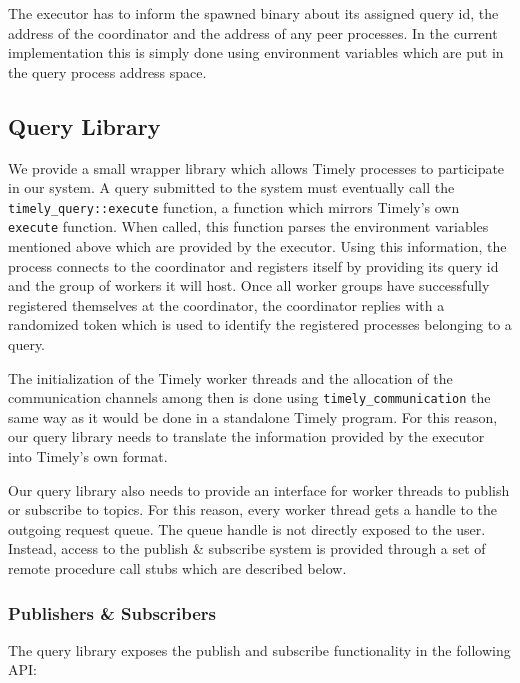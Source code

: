 The executor has to inform the spawned binary about its assigned query id,
the address of the coordinator and the address of any peer processes. In the
current implementation this is simply done using environment variables which
are put in the query process address space.


\subsection{Query Library}

We provide a small wrapper library which allows Timely processes to participate
in our system. A query submitted to the system must eventually call the 
\lstinline{timely_query::execute} function, a function which mirrors Timely's
own \lstinline{execute} function. When called, this function parses the
environment variables mentioned above which are provided by the executor.
Using this information, the process connects to the coordinator and registers
itself by providing its query id and the group of workers it will host. Once
all worker groups have successfully registered themselves at the coordinator,
the coordinator replies with a randomized token which is used to identify
the registered processes belonging to a query. 

The initialization of the Timely worker threads and the allocation of the
communication channels among then is done using \lstinline{timely_communication}
the same way as it would be done in a standalone Timely program. For this
reason, our query library needs to translate the information provided by the
executor into Timely's own format.

Our query library also needs to provide an interface for worker threads to
publish or subscribe to topics. For this reason, every worker thread gets
a handle to the outgoing request queue. The queue handle is not directly exposed
to the user. Instead, access to the publish \& subscribe system is provided
through a set of remote procedure call stubs which are described below.

\subsubsection{Publishers \& Subscribers}

The query library exposes the publish and subscribe functionality in the
following API:

